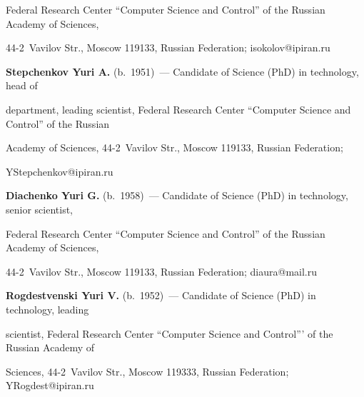 Federal Research Center ``Computer Science and Control'' of the Russian Academy of Sciences,  

44-2~Vavilov Str., Moscow 119133, Russian Federation; \mbox{isokolov@ipiran.ru}



\vspace*{3pt}



\noindent

\textbf{Stepchenkov Yuri A.} (b.\ 1951)~--- Candidate of Science (PhD) in technology, head of 

department, leading scientist, Federal Research Center ``Computer Science and Control'' of the Russian 

Academy of Sciences, 44-2~Vavilov Str., Moscow 119133, Russian Federation; 

\mbox{YStepchenkov@ipiran.ru}



\vspace*{3pt}



\noindent

\textbf{Diachenko Yuri G.} (b.\ 1958)~--- Candidate of Science (PhD) in technology, senior scientist, 

Federal Research Center ``Computer Science and Control'' of the Russian Academy of Sciences,  

44-2~Vavilov Str., Moscow 119133, Russian Federation; \mbox{diaura@mail.ru}



\vspace*{3pt}



\noindent

\textbf{Rogdestvenski Yuri V.} (b.\ 1952)~--- Candidate of Science (PhD) in technology, leading 

scientist, Federal Research Center ``Computer Science and Control''' of the Russian Academy of 

Sciences, 44-2~Vavilov Str., Moscow 119333, Russian Federation; \mbox{YRogdest@ipiran.ru}



 



\label{end\stat}



\renewcommand{\bibname}{\protect\rm Литература}    


